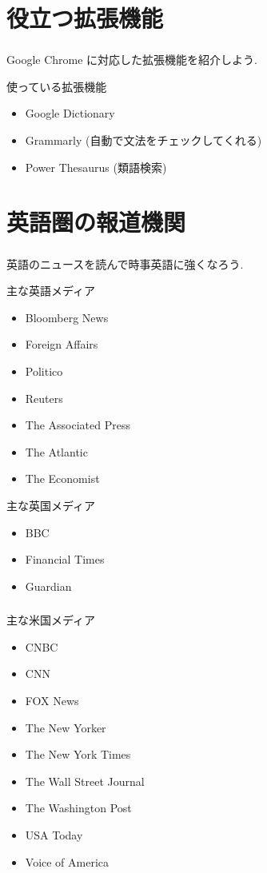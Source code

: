 \documentclass[dvipdfmx,10pt]{beamer}
\begin{document}
\section{役立つ拡張機能}
\begin{frame}\frametitle{\insertsection}
Google Chrome に対応した拡張機能を紹介しよう.
\begin{exampleblock}{使っている拡張機能}
\begin{itemize}
\item Google Dictionary
\item Grammarly (自動で文法をチェックしてくれる)
\item Power Thesaurus (類語検索)
\end{itemize}
\end{exampleblock}
\end{frame}
\section{英語圏の報道機関}
\begin{frame}\frametitle{\insertsection}
\footnotesize
英語のニュースを読んで時事英語に強くなろう.
\begin{exampleblock}{主な英語メディア}
\begin{itemize}
\item Bloomberg News
\item Foreign Affairs
\item Politico
\item Reuters
\item The Associated Press
\item The Atlantic
\item The Economist
\end{itemize}
\end{exampleblock}
\begin{exampleblock}{主な英国メディア}
\begin{itemize}
\item BBC
\item Financial Times
\item Guardian
\end{itemize}
\end{exampleblock}
\normalsize
\end{frame}
\begin{frame}\frametitle{\insertsection}
\footnotesize
\begin{exampleblock}{主な米国メディア}
\begin{itemize}
\item CNBC
\item CNN
\item FOX News
\item The New Yorker
\item The New York Times
\item The Wall Street Journal
\item The Washington Post
\item USA Today
\item Voice of America
\end{itemize}
\end{exampleblock}
\normalsize
\end{frame}
\end{document}
